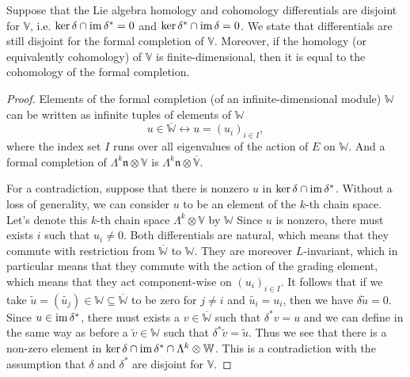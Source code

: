 \begin{proposition}
 Suppose that the Lie algebra homology and cohomology differentials are disjoint for $\mathbb{V}$, i.e. $\ker \delta \cap \operatorname{\mathrm{im}} \delta^* = 0$ and $\ker \delta^* \cap \operatorname{\mathrm{im}} \delta = 0$. We state that differentials are still disjoint for the formal completion of $\mathbb{V}$. Moreover, if the homology (or equivalently cohomology) of $\mathbb{V}$ is finite-dimensional, then it is equal to the cohomology of the formal completion.
\end{proposition}

\begin{proof}

Elements of the formal completion (of an infinite-dimensional module) $\mathbb{W}$ can be written as infinite tuples of elements of $\mathbb{W}$
$$
u\in\overline{\mathbb{W}} \leftrightarrow u = (u_i)_{i\in I},
$$
where the index set $I$ runs over all eigenvalues of the action of $E$ on $\mathbb{W}$. And a formal completion of $ \Lambda^k \mathfrak{n} \otimes \mathbb{V}$ is  $\Lambda^k \mathfrak{n}  \otimes \overline{\mathbb{V}}$.

For a contradiction, suppose that there is nonzero $u$ in $\ker \delta \cap \operatorname{\mathrm{im}} \delta^*$. Without a loss of generality, we can consider $u$ to be an element of the $k$-th chain space. Let's denote this $k$-th chain space  $\Lambda^k\otimes \mathbb{V}$ by $\mathbb{W}$ Since $u$ is nonzero, there must exists $i$ such that $u_i\neq 0$. Both differentials are natural, which means that they commute with restriction from $\overline{\mathbb{W}}$ to $\mathbb{W}$. They are moreover $L$-invariant, which in particular means that they commute with the action of the grading element, which means that they act component-wise on $(u_i)_{i \in I}$. It follows that if we take $\widetilde{u}= (\widetilde{u_j})\in \mathbb{W} \subseteq \overline{\mathbb{W}}$ to be zero  for $j\neq i$ and $\widetilde{u_i} = u_i$, then we have $\delta \widetilde{u} = 0$.  Since $u\in \operatorname{\mathrm{im}} \delta^*$, there must exists a $v\in\overline{\mathbb{W}}$ such that $\delta^* v = u$ and we can define in the same way as before a $\widetilde{v}\in\mathbb{W}$
such that $\delta^* \widetilde{v} = \widetilde{u}$. Thus we see that there is a non-zero element in $\ker \delta \cap \operatorname{\mathrm{im}} \delta^*\cap \Lambda^k\otimes \mathbb{W}$. This is a contradiction with the assumption that $\delta$ and $\delta^*$ are disjoint for $\mathbb{V}$.



\end{proof}
